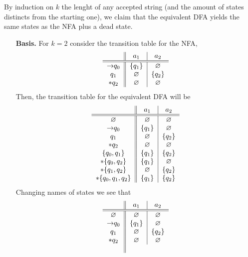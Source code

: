 \documentclass{article}
\theoremstyle{remark}
\begin{document}
\begin{enumerate}
    By induction on $k$ the lenght of any accepted string (and the amount of states distincts from the starting one),
    we claim that the equivalent DFA yields the same states as the NFA plus a dead state.
    \begin{enumerate}
        \item[\textbf{Basis.}] For $k=2$ consider the transition table for the NFA,
        \[
            \begin{tabular}{c||c|c}
                & $a_1$ & $a_2$\\
                \hline\hline
                $\rightarrow$$q_0$ & $\{q_1\}$ & $\varnothing$\\
                $q_1$ & $\varnothing$ & $\{q_2\}$ \\
                $*q_2$ & $\varnothing$ & $\varnothing$  
            \end{tabular}
        \]
        Then, the transition table for the equivalent DFA will be 
        \[
            \begin{tabular}{c||c|c}
                & $a_1$ & $a_2$\\
                \hline\hline
                $\varnothing$ & $\varnothing$ & $\varnothing$\\
                $\rightarrow$$q_0$ & $\{q_1\}$ & $\varnothing$\\
                $q_1$ & $\varnothing$ & $\{q_2\}$ \\
                $*q_2$ & $\varnothing$ & $\varnothing$\\
                $\{q_0,q_1\}$ & $\{q_1\}$ & $\{q_2\}$\\
                $*\{q_0,q_2\}$ & $\{q_1\}$ & $\varnothing$\\
                $*\{q_1,q_2\}$ & $\varnothing$ & $\{q_2\}$\\
                $*\{q_0,q_1,q_2\}$ & $\{q_1\}$ & $\{q_2\}$
            \end{tabular}
        \]
        Changing names of states we see that 
        \[
            \begin{tabular}{c||c|c}
                & $a_1$ & $a_2$\\
                \hline\hline
                $\varnothing$ & $\varnothing$ & $\varnothing$\\
                $\rightarrow$$q_0$ & $\{q_1\}$ & $\varnothing$\\
                $q_1$ & $\varnothing$ & $\{q_2\}$ \\
                $*q_2$ & $\varnothing$ & $\varnothing$\\
$$
\end{tabular}\]
\end{enumerate}
\end{enumerate}
\end{document}
